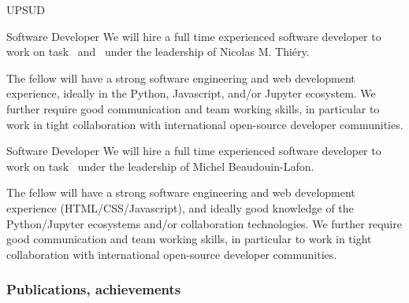 \begin{sitedescription}{UPSUD}




\begin{participant}[type=R,PM=21]{Software Developer}
  We will hire a full time experienced software developer to work on
  task~ and~ %
  under the leadership of Nicolas M. Thiéry.

  The fellow will have a strong software engineering and web
  development experience, ideally in the Python, Javascript, and/or
  Jupyter ecosystem. We further require good communication and team
  working skills, in particular to work in tight collaboration with
  international open-source developer communities.
\end{participant}

\begin{participant}[type=R,PM=12]{Software Developer}
  We will hire a full time experienced software developer to work
  on task~ %
  under the leadership of Michel Beaudouin-Lafon.

  The fellow will have a strong software engineering and web
  development experience (HTML/CSS/Javascript), and ideally 
  good knowledge of the Python/Jupyter ecosystems
  and/or collaboration technologies. 
  We further require good communication and team
  working skills, in particular to work in tight collaboration with
  international open-source developer communities.
\end{participant}


\subsubsection*{Publications, achievements}


\end{sitedescription}
